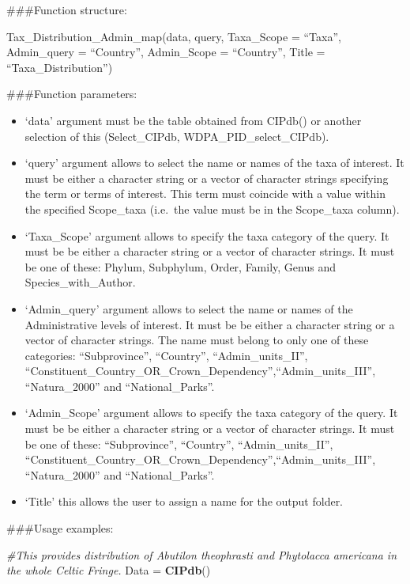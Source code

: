 \documentclass[
]{article}
\newenvironment{Shaded}{\begin{snugshade}}{\end{snugshade}}
\newcommand{\CommentTok}[1]{\textcolor[rgb]{0.56,0.35,0.01}{\textit{#1}}}
\newcommand{\FunctionTok}[1]{\textcolor[rgb]{0.13,0.29,0.53}{\textbf{#1}}}
\newcommand{\NormalTok}[1]{#1}
\newcommand{\OtherTok}[1]{\textcolor[rgb]{0.56,0.35,0.01}{#1}}
\providecommand{\tightlist}{%
  \setlength{\itemsep}{0pt}\setlength{\parskip}{0pt}}
\begin{document}
\#\#\#Function structure:

Tax\_Distribution\_Admin\_map(data, query, Taxa\_Scope = ``Taxa'',
Admin\_query = ``Country'', Admin\_Scope = ``Country'', Title =
``Taxa\_Distribution'')

\#\#\#Function parameters:

\begin{itemize}
\tightlist
\item
  `data' argument must be the table obtained from CIPdb() or another
  selection of this (Select\_CIPdb, WDPA\_PID\_select\_CIPdb).
\item
  `query' argument allows to select the name or names of the taxa of
  interest. It must be either a character string or a vector of
  character strings specifying the term or terms of interest. This term
  must coincide with a value within the specified Scope\_taxa (i.e.~the
  value must be in the Scope\_taxa column).
\item
  `Taxa\_Scope' argument allows to specify the taxa category of the
  query. It must be be either a character string or a vector of
  character strings. It must be one of these: Phylum, Subphylum, Order,
  Family, Genus and Species\_with\_Author.
\item
  `Admin\_query' argument allows to select the name or names of the
  Administrative levels of interest. It must be be either a character
  string or a vector of character strings. The name must belong to only
  one of these categories: ``Subprovince'', ``Country'',
  ``Admin\_units\_II'',
  ``Constituent\_Country\_OR\_Crown\_Dependency'',``Admin\_units\_III'',
  ``Natura\_2000'' and ``National\_Parks''.
\item
  `Admin\_Scope' argument allows to specify the taxa category of the
  query. It must be be either a character string or a vector of
  character strings. It must be one of these: ``Subprovince'',
  ``Country'', ``Admin\_units\_II'',
  ``Constituent\_Country\_OR\_Crown\_Dependency'',``Admin\_units\_III'',
  ``Natura\_2000'' and ``National\_Parks''.
\item
  `Title' this allows the user to assign a name for the output folder.
\end{itemize}

\#\#\#Usage examples:

\begin{Shaded}
\begin{Highlighting}[]
\CommentTok{\#This provides distribution of Abutilon theophrasti and Phytolacca americana in the whole Celtic Fringe.}
\NormalTok{Data }\OtherTok{=} \FunctionTok{CIPdb}\NormalTok{()}
\end{Highlighting}
\end{Shaded}
\end{document}
